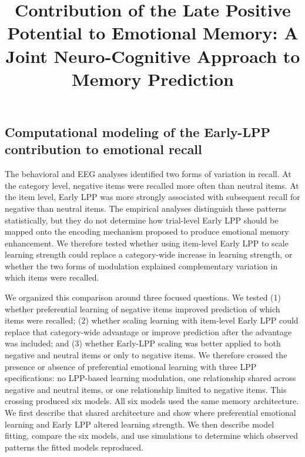 \documentclass[
  man,
  longtable,
  nolmodern,
  notxfonts,
  notimes,
  draftfirst,
  colorlinks=true,linkcolor=blue,citecolor=blue,urlcolor=blue]{apa7}
\title{Contribution of the Late Positive Potential to Emotional Memory:
A Joint Neuro-Cognitive Approach to Memory Prediction}
\begin{document}
\maketitle


\setcounter{secnumdepth}{-\maxdimen} %

\setlength\LTleft{0pt}


\subsection{Computational modeling of the Early-LPP contribution to
emotional
recall}\label{computational-modeling-of-the-early-lpp-contribution-to-emotional-recall}

The behavioral and EEG analyses identified two forms of variation in
recall. At the category level, negative items were recalled more often
than neutral items. At the item level, Early LPP was more strongly
associated with subsequent recall for negative than neutral items. The
empirical analyses distinguish these patterns statistically, but they do
not determine how trial-level Early LPP should be mapped onto the
encoding mechanism proposed to produce emotional memory enhancement. We
therefore tested whether using item-level Early LPP to scale learning
strength could replace a category-wide increase in learning strength, or
whether the two forms of modulation explained complementary variation in
which items were recalled.

We organized this comparison around three focused questions. We tested
(1) whether preferential learning of negative items improved prediction
of which items were recalled; (2) whether scaling learning with
item-level Early LPP could replace that category-wide advantage or
improve prediction after the advantage was included; and (3) whether
Early-LPP scaling was better applied to both negative and neutral items
or only to negative items. We therefore crossed the presence or absence
of preferential emotional learning with three LPP specifications: no
LPP-based learning modulation, one relationship shared across negative
and neutral items, or one relationship limited to negative items. This
crossing produced six models. All six models used the same memory
architecture. We first describe that shared architecture and show where
preferential emotional learning and Early LPP altered learning strength.
We then describe model fitting, compare the six models, and use
simulations to determine which observed patterns the fitted models
reproduced.
\end{document}
